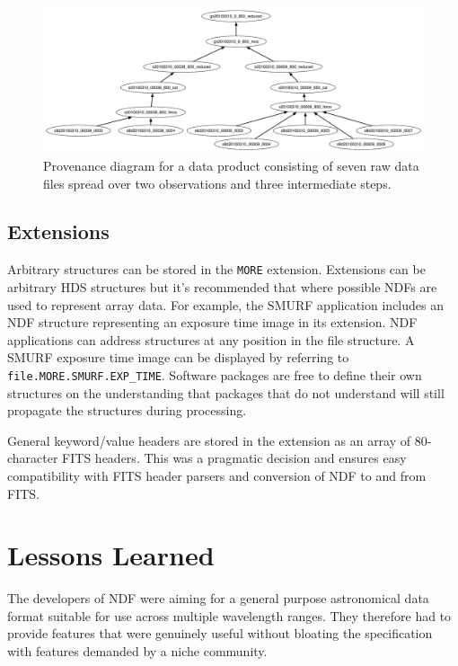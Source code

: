 \documentclass[11pt,twoside]{article}
\begin{document}
\begin{figure}
\includegraphics[width=\textwidth]{P91_f1}
\caption{Provenance diagram for a data product consisting of seven raw
  data files spread over two observations and three intermediate steps.}
\label{fig:P91_f1}
\end{figure}

\subsection{Extensions}

Arbitrary structures can be stored in the \texttt{MORE}
extension. Extensions can be arbitrary HDS structures but it's
recommended that where possible NDFs are used to represent array
data. For example, the SMURF application includes an NDF structure
representing an exposure time image in its extension. NDF applications
can address structures at any position in the file structure. A SMURF
exposure time image can be displayed by referring to
\texttt{file.MORE.SMURF.EXP\_TIME}. Software packages are free to
define their own structures on the understanding that packages that do
not understand will still propagate the structures during processing.

General keyword/value headers are stored in the extension as an array of
80-character FITS headers. This was a pragmatic decision and ensures
easy compatibility with FITS header parsers and conversion of NDF to
and from FITS.

\section{Lessons Learned}

The developers of NDF were aiming for a general purpose astronomical
data format suitable for use across multiple wavelength ranges. They
therefore had to provide features that were genuinely useful without
bloating the specification with features demanded by a niche
community.
\end{document}
